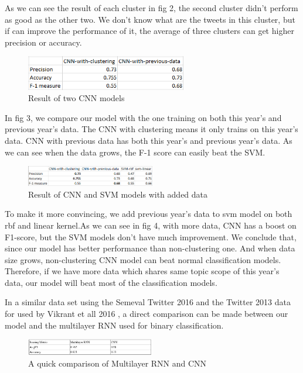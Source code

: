 \documentclass[conference]{IEEEtran}
\begin{document}
As we can see the result of each cluster in fig 2, the second cluster didn't perform as good as the other two. We don't know what are the tweets in this cluster, but if can improve the performance of it, the average of three clusters can get higher precision or accuracy.

\begin{figure}[h]
\centering
\includegraphics[width=70mm,scale=0.5]{Capture(4)}
\caption{Result of two CNN models}
\end{figure}

In fig 3, we compare our model with the one training on both this year's and previous year's data. The CNN with clustering means it only trains on this year's data. CNN with previous data has both this year's and previous year's data. As we can see when the data grows, the F-1 score can easily beat the SVM. 

\begin{figure}[h]
\centering
\includegraphics[width=0.5\textwidth]{Capture(5)}
\caption{Result of CNN and SVM models with added data}
\end{figure}


To make it more convincing, we add previous year's data to svm model on both rbf and linear kernel.As we can see in fig 4, with more data, CNN has a boost on F1-score, but the SVM models don't have much improvement. We conclude that, since our model has better performance than non-clustering one. And when data size grows, non-clustering CNN model can beat normal classification models. Therefore, if we have more data which shares same topic scope of this year's data, our model will beat most of the classification models.


In a similar data set using the Semeval Twitter 2016 and the Twitter 2013 data for used by Vikrant et all 2016 , a direct comparison can be made between our model and the multilayer RNN used for binary classification. 
\begin{figure}[h]
\centering
\includegraphics[width=0.5\textwidth]{Capture(6)}
\caption{A quick comparison of Multilayer RNN and CNN}
\end{figure}
\end{document}
